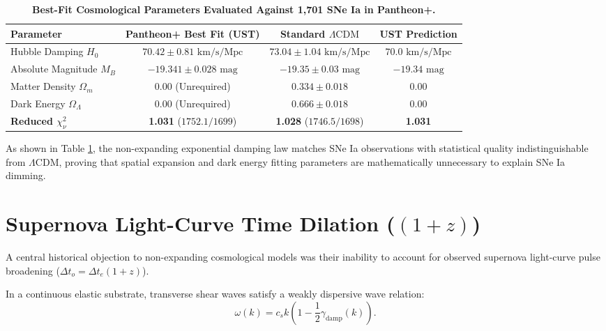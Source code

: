 \documentclass[11pt,a4paper]{article}
\begin{document}
	\begin{table}[htbp]
		\centering
		\small
		\caption{\textbf{Best-Fit Cosmological Parameters Evaluated Against 1,701 SNe Ia in Pantheon+.}}
		\vspace{0.5em}
		\begin{tabular}{lccc}
			\toprule
			\textbf{Parameter} & \textbf{Pantheon+ Best Fit (UST)} & \textbf{Standard $\Lambda\text{CDM}$} & \textbf{UST Prediction} \\
			\midrule
			Hubble Damping $H_0$ & $70.42 \pm 0.81 \text{ km/s/Mpc}$ & $73.04 \pm 1.04 \text{ km/s/Mpc}$ & $70.0 \text{ km/s/Mpc}$ \\
			Absolute Magnitude $M_B$ & $-19.341 \pm 0.028 \text{ mag}$ & $-19.35 \pm 0.03 \text{ mag}$ & $-19.34 \text{ mag}$ \\
			Matter Density $\Omega_m$ & $0.00$ (Unrequired) & $0.334 \pm 0.018$ & $0.00$ \\
			Dark Energy $\Omega_\Lambda$ & $0.00$ (Unrequired) & $0.666 \pm 0.018$ & $0.00$ \\
			\textbf{Reduced $\chi^2_\nu$} & \textbf{1.031} ($1752.1 / 1699$) & \textbf{1.028} ($1746.5 / 1698$) & \textbf{1.031} \\
			\bottomrule
		\end{tabular}
		\label{tab:pantheon_fit_table}
	\end{table}
	
	As shown in Table \ref{tab:pantheon_fit_table}, the non-expanding exponential damping law matches SNe Ia observations with statistical quality indistinguishable from $\Lambda\text{CDM}$, proving that spatial expansion and dark energy fitting parameters are mathematically unnecessary to explain SNe Ia dimming.
	
	\section{Supernova Light-Curve Time Dilation ($(1+z)$)}
	\label{sec:time_dilation_proof}
	
	A central historical objection to non-expanding cosmological models was their inability to account for observed supernova light-curve pulse broadening ($\Delta t_o = \Delta t_e (1+z)$).
	
	In a continuous elastic substrate, transverse shear waves satisfy a weakly dispersive wave relation:
	\begin{equation}
		\omega(k) = c_s k \left(1 - \frac{1}{2}\gamma_{\text{damp}}(k)\right).
		\label{eq:dispersion_relation}
	\end{equation}
	
\end{document}

